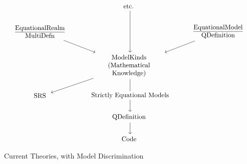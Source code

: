 
\begin{figure}[H]
	\centering
	\caption{Current Theories, with Model Discrimination}
	\label{fig:theoriesWithModelKinds}

	\[\begin{tikzcd}[align=center]
			& {etc.} \\
			{\parbox{3.5cm}{\centering \underline{EquationalRealm} MultiDefn}} &&
			{\parbox{3.5cm}{\centering \underline{EquationalModel} QDefinition}} \\
			& {\parbox{3.5cm}{\centering ModelKinds (Mathematical Knowledge)}} \\
			SRS \\
			& QDefinition \\
			& Code
			\arrow[from=2-3, to=3-2]
			\arrow[from=2-1, to=3-2]
			\arrow[from=1-2, to=3-2]
			\arrow[from=3-2, to=4-1]
			\arrow["{Strictly Equational Models}"{description}, from=3-2, to=5-2]
			\arrow[from=5-2, to=6-2]
		\end{tikzcd}\]

\end{figure}


